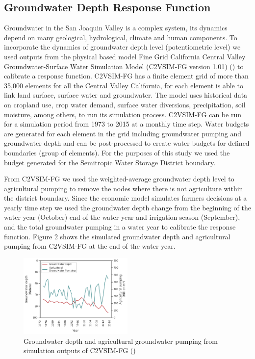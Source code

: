 \documentclass[11pt,a4paper]{article}
\begin{document}
\subsection{Groundwater Depth Response Function}

Groundwater in the San Joaquin Valley is a complex system, its dynamics depend on many geological, hydrological, climate and human components. To incorporate the dynamics of groundwater depth level (potentiometric level) we used outputs from the physical based model Fine Grid California Central Valley Groundwater-Surface Water Simulation Model (C2VSIM-FG version 1.01) (\cite{dwr_c2vsimfg_2021}) to calibrate a response function. C2VSIM-FG has a finite element grid of more than 35,000 elements for all the Central Valley California, for each element is able to link land surface, surface water and groundwater. The model uses historical data on cropland use, crop water demand, surface water diversions, precipitation, soil moisture, among others, to run its simulation process. C2VSIM-FG can be run for a simulation period from 1973 to 2015 at a monthly time step. Water budgets are generated for each element in the grid including groundwater pumping and groundwater depth and can be post-processed to create water budgets for defined boundaries (group of elements). For the purposes of this study we used the budget generated for the Semitropic Water Storage District boundary. 

From C2VSIM-FG we used the weighted-average groundwater depth level to agricultural pumping to remove the nodes where there is not agriculture within the district boundary. Since the economic model simulates farmers decisions at a yearly time step we used the groundwater depth change from the beginning of the water year (October) end of the water year and irrigation season (September), and the total groundwater pumping in a water year to calibrate the response function. Figure 2 shows the simulated groundwater depth and agricultural pumping from C2VSIM-FG at the end of the water year. 

\begin{figure}[H]
    \centering
    \includegraphics[width=0.5\textwidth]{c2vsim_semitropic.png}
    \caption{Groundwater depth and agricultural groundwater pumping from simulation outputs of C2VSIM-FG (\cite{dwr_c2vsimfg_2021})}
    \label{fig:mes1h1}
\end{figure}
\end{document}
